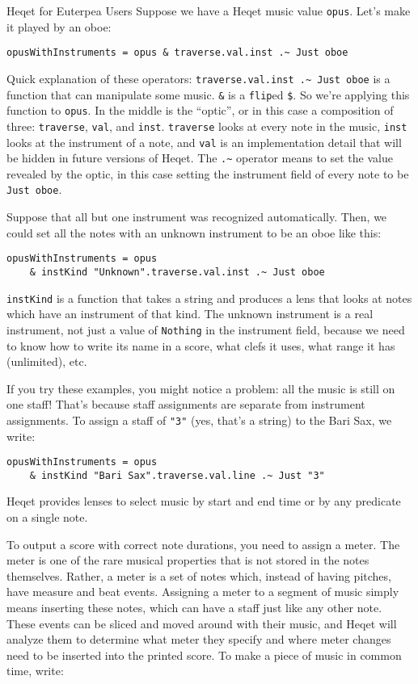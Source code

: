 \documentclass{article}
\begin{document}
\begin{section}{Heqet for Euterpea Users}
Suppose we have a Heqet music value \verb+opus+. Let's make it played by an oboe:

\verb+opusWithInstruments = opus & traverse.val.inst .~ Just oboe+

Quick explanation of these operators: \verb+traverse.val.inst .~ Just oboe+ is a function that can manipulate some music. \verb+&+ is a \verb+flip+ed  \verb+$+. So we're applying this function to \verb+opus+. In the middle is the ``optic'', or in this case a composition of three: \verb+traverse+, \verb+val+, and \verb+inst+. \verb+traverse+ looks at every note in the music, \verb+inst+ looks at the instrument of a note, and \verb+val+ is an implementation detail that will be hidden in future versions of Heqet. The \verb+.~+ operator means to set the value revealed by the optic, in this case setting the instrument field of every note to be \verb+Just oboe+. 

Suppose that all but one instrument was recognized automatically. Then, we could set all the notes with an unknown instrument to be an oboe like this:

\begin{verbatim}opusWithInstruments = opus 
    & instKind "Unknown".traverse.val.inst .~ Just oboe
\end{verbatim}

\verb+instKind+ is a function that takes a string and produces a lens that looks at notes which have
an instrument of that kind. The unknown instrument is a real instrument, not just a value of \verb+Nothing+ in the instrument field, because we need to know how to write its name in a score, what clefs it uses, what range it has (unlimited), etc. 

If you try these examples, you might notice a problem: all the music is still on one staff! That's because staff assignments are separate from instrument assignments. To assign a staff of \verb+"3"+ (yes, that's a string) to the Bari Sax, we write:

\begin{verbatim}opusWithInstruments = opus 
    & instKind "Bari Sax".traverse.val.line .~ Just "3"
\end{verbatim}

Heqet provides lenses to select music by start and end time or by any predicate on a single note. 

To output a score with correct note durations, you need to assign a meter.  The meter is one of the rare musical properties that is not stored in the notes themselves. Rather, a meter is a set of notes which, instead of having pitches, have measure and beat events. Assigning a meter to a segment of music simply means inserting these notes, which can have a staff just like any other note. These events can be sliced and moved around with their music, and  Heqet will analyze them to determine what meter they specify and where meter changes need to be inserted into the printed score. To make a piece of music in common time, write:


\end{section}
\end{document}
